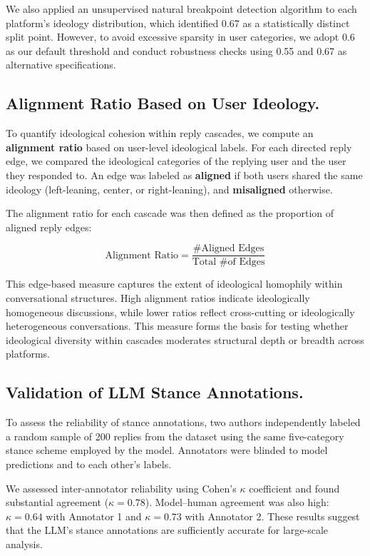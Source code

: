 \documentclass[letterpaper]{article} %
\begin{document}
We also applied an unsupervised natural breakpoint detection algorithm to each platform's ideology distribution, which identified 0.67 as a statistically distinct split point. However, to avoid excessive sparsity in user categories, we adopt 0.6 as our default threshold and conduct robustness checks using 0.55 and 0.67 as alternative specifications.

\subsection*{Alignment Ratio Based on User Ideology.}

To quantify ideological cohesion within reply cascades, we compute an \textbf{alignment ratio} based on user-level ideological labels. For each directed reply edge, we compared the ideological categories of the replying user and the user they responded to. An edge was labeled as \textbf{aligned} if both users shared the same ideology (left-leaning, center, or right-leaning), and \textbf{misaligned} otherwise.

The alignment ratio for each cascade was then defined as the proportion of aligned reply edges:

\[
\text{Alignment Ratio} = \frac{\text{\# Aligned Edges}}{\text{Total \# of Edges}}
\]

This edge-based measure captures the extent of ideological homophily within conversational structures. High alignment ratios indicate ideologically homogeneous discussions, while lower ratios reflect cross-cutting or ideologically heterogeneous conversations. This measure forms the basis for testing whether ideological diversity within cascades moderates structural depth or breadth across platforms.

\subsection*{Validation of LLM Stance Annotations.}

To assess the reliability of stance annotations, two authors independently labeled a random sample of 200 replies from the dataset using the same five-category stance scheme employed by the model. Annotators were blinded to model predictions and to each other's labels.

We assessed inter-annotator reliability using Cohen’s $\kappa$ coefficient and found substantial agreement ($\kappa = 0.78$). Model–human agreement was also high: $\kappa = 0.64$ with Annotator 1 and $\kappa = 0.73$ with Annotator 2. These results suggest that the LLM’s stance annotations are sufficiently accurate for large-scale analysis.
\end{document}
